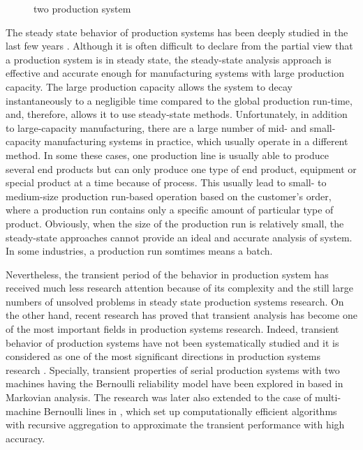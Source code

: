 \begin{figure*}[!ht]
	\centering
	\caption{two production system}
	\label{Serial productionline and assembly system.}
\end{figure*}


The steady state behavior of production systems has been deeply studied in the last few years \cite{chiang2000improvability, chiang1970improvability}. Although it is often difficult to declare from the partial view that a production system is in steady state, the steady-state analysis approach is effective and accurate enough for manufacturing systems with large production capacity. The large production capacity allows the system to decay instantaneously to a negligible time compared to the global production run-time, and, therefore, allows it to use steady-state methods. Unfortunately, in addition to large-capacity manufacturing, there are a large number of mid- and small-capacity manufacturing systems in practice, which usually operate in a different method. In some these cases, one production line is usually able to produce several end products but can only produce one type of end product, equipment or special product at a time because of process. This usually lead to small- to medium-size production run-based operation based on the customer's order, where a production run contains only a specific amount of particular type of product. Obviously, when the size of the production run is relatively small, the steady-state approaches cannot provide an ideal and accurate analysis of system. In some industries, a production run somtimes means a batch.

Nevertheless, the transient period of the behavior in production system has received much less research attention because of its complexity and the still large numbers of unsolved problems in steady state production systems research. On the other hand, recent research \cite{li2009throughput} has proved that transient analysis has become one of the most important fields in production systems research. Indeed, transient behavior of production systems have not been systematically studied and it is considered as one of the most significant directions in production systems research \cite{li2009throughput}. Specially, transient properties of serial production systems with two machines having the Bernoulli reliability model have been explored in \cite{meerkov2008transient, meerkov2009transients, meerkov2011unbalanced} based in Markovian analysis. The research was later also extended to the case of multi-machine Bernoulli lines in \cite{zhang2013transient, chen2012energy}, which set up computationally efficient algorithms with recursive aggregation to approximate the transient performance with high accuracy. 

